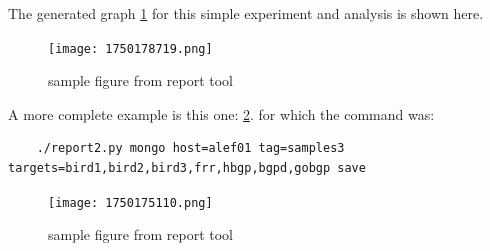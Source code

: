  The generated graph \ref{fig:1750178719} for this simple experiment and analysis is shown here.

 \begin{figure}[H]
    \centering
    \texttt{[image: 1750178719.png]}
    \caption{sample figure from report tool}
    \label{fig:1750178719}
\end{figure}

A more complete example is this one: \ref{fig:1750175110}.
for which the command was:
    \begin{lstlisting}
    ./report2.py mongo host=alef01 tag=samples3 targets=bird1,bird2,bird3,frr,hbgp,bgpd,gobgp save
    \end{lstlisting}

  \begin{figure}[H]
    \centering
    \texttt{[image: 1750175110.png]}
    \caption{sample figure from report tool    }
    \label{fig:1750175110}
\end{figure}


